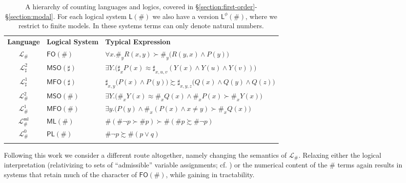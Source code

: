 \documentclass[12pt,oneside,reqno]{amsart}
\theoremstyle{definition}
\begin{document}
\begin{table}
    \centering
    \begin{tabular}{c | l | l}
       \textbf{Language} \;\quad & \quad \textbf{Logical System} \;\quad & \quad \textbf{Typical Expression} \\ \hhline{===}
       $\mathcal{L}_\#$ \quad & \quad $\mathsf{FO}(\#)$ \quad & \quad $\forall x. \#_y R(x,y) \succ \#_y \big(R(y,x) \wedge P(y)\big)$ \\ \hhline{---} 
       $\mathcal{L}^2_\sharp$ \quad & \quad $\mathsf{MSO}(\sharp)$ \quad&\quad $\exists Y. \big( \sharp_x P(x) \approx \sharp_{x,u,v}(Y(x) \wedge Y(u) \wedge Y(v)) \big)$ \\ \hhline{---} 
       $\mathcal{L}^1_\sharp$ \quad & \quad $\mathsf{MFO}(\sharp)$ \quad&\quad  $\sharp_{x,y} \big(P(x) \wedge P(y)\big) \succsim \sharp_{x,y,z}\big(Q(x) \wedge Q(y) \wedge Q(z)\big)$ \\ \hhline{---} 
       $\mathcal{L}_\#^2$  \quad & \quad $\mathsf{MSO}(\#)$ \quad & \quad $\exists Y.\big(\#_x Y(x) \approx \#_x Q(x) \wedge \#_x P(x) \succ \#_xY(x)\big) $ \\  \hhline{---} 
       $\mathcal{L}_\#^1$  \quad & \quad $\mathsf{MFO}(\#)$ \quad & \quad $\exists y.\big( P(y) \wedge \#_x(P(x) \wedge x\neq y) \succ \#_x Q(x)\big) $ \\ \hhline{---}  
        $\mathcal{L}_\#^{\textsf{ml}}$ \quad & \quad  $\mathsf{ML}(\#)$ \quad & \quad $\#(\#\neg p \succ \# p) \succ \#(\#p \succsim \#\neg p)$ \\ \hhline{---}
       $\mathcal{L}_\#^0$ \quad & \quad $\mathsf{PL}(\#)$ \quad & \quad  $\#\neg p \succsim \#(p \vee q)$ \\ \hhline{---}
    \end{tabular} \vspace{.1in} 
    \vspace{1ex}
    \caption{A hierarchy of counting languages and logics, covered in  \S\ref{section:first-order}-\S\ref{section:modal}. For each logical system $\mathsf{L}(\#)$ we also have a version $\mathsf{L}^\phi(\#)$, where we restrict to finite models. In these systems terms can only denote natural numbers.}
    \label{table:overview}
\end{table}

Following this work we consider a different route altogether, namely changing the semantics of $\mathcal{L}_\#$. Relaxing either the logical interpretation (relativizing to sets of ``admissible'' variable assignments; cf. \citealt{Nemeti}) or the numerical content of the $\#$ terms again results in systems that retain much of the character of $\mathsf{FO}(\#)$, while gaining in tractability. 
\end{document}
